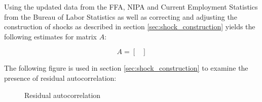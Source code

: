 Using the updated data from the FFA, NIPA and Current Employment Statistics from the Bureau of Labor Statistics as well as correcting and adjusting the construction of shocks as described in section \ref{sec:shock_construction} yields the following estimates for matrix $A$:

\begin{center}
\[
    A=
      \begin{bmatrix}
    	
      \end{bmatrix}
\]
\end{center}

The following figure is used in section \ref{sec:shock_construction} to examine the presence of residual autocorrelation:

\begin{figure}[h]
	\caption{Residual autocorrelation}
	\label{fig:residual_autocorrelation}
\end{figure}